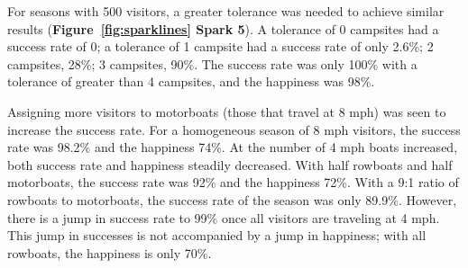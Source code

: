 \documentclass[11pt]{article} %
\begin{document}
For seasons with 500 visitors, a greater tolerance was needed to achieve
similar results (\textbf{Figure~\ref{fig:sparklines} Spark 5}).
A tolerance of 0 campsites
had a success rate of 0; a tolerance of 1 campsite had a success rate of
only 2.6\%; 2 campsites, 28\%; 3 campsites, 90\%. The
success rate was only 100\% with a tolerance of greater than 4 campsites,
and the happiness was 98\%.

Assigning more visitors to motorboats (those that travel at 8 mph) was seen
to increase the success rate. For a homogeneous season of 8 mph visitors, the
success rate was 98.2\% and the happiness 74\%. At the number
of 4 mph boats increased, both success rate and happiness steadily decreased.
With half rowboats and half motorboats, the success rate was 92\% and
the happiness 72\%. With a 9:1 ratio of rowboats to motorboats, the
success rate of the season was only 89.9\%. However, there is a jump
in success rate to 99\% once all visitors are traveling at 4 mph. This
jump in successes is not accompanied by a jump in happiness; with all
rowboats, the happiness is only 70\%.
\end{document}
